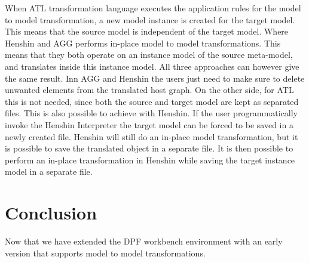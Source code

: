 When ATL transformation language executes the application rules for the model to
model transformation, a new model instance is created for the target model. This
means that the source model is independent of the target model. Where Henshin
and AGG performs in-place model to model transformations. This means that they
both operate on an instance model of the source meta-model, and translates
inside this instance model. All three approaches can however give the same
result. Inn AGG and Henshin the users just need to make sure to delete unwanted
elements from the translated host graph. On the other side, for ATL this is not
needed, since both the source and target model are kept as separated files. This
is also possible to achieve with Henshin. If the user programmatically invoke
the Henshin Interpreter the target model can be forced to be saved in a newly
created file. Henshin will still do an in-place model transformation, but it is
possible to save the translated object in a separate file. It is then possible
to perform an in-place transformation in Henshin while saving the target
instance model in a separate file. 

\section{Conclusion}

Now that we have extended the DPF workbench environment with an early version
that supports model to model transformations.

